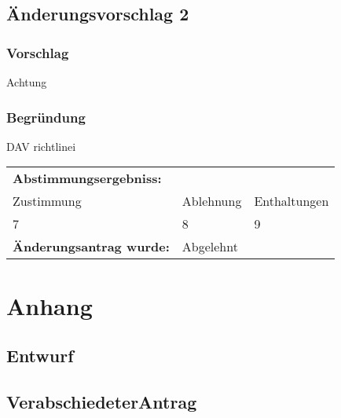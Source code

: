 \documentclass[12pt,a4paper]{scrartcl}
\begin{document}
\subsection{Änderungsvorschlag 2}
\subsubsection*{Vorschlag}
Achtung
\subsubsection*{Begründung}
DAV richtlinei\vspace{1.5ex} \\
\begin{tabularx}{\linewidth}{@{}XXX}
\textbf{Abstimmungsergebniss:}&&\\
Zustimmung & Ablehnung & Enthaltungen \\
7 & 8 & 9 \\
\multicolumn{@{}2}{l}{\textbf{Änderungsantrag wurde:}} & Abgelehnt \\
\end{tabularx}
\appendix
\section*{Anhang}
\subsection*{Entwurf} \label{An:1}
%
\subsection*{VerabschiedeterAntrag} \label{An:2}
%
\end{document}
